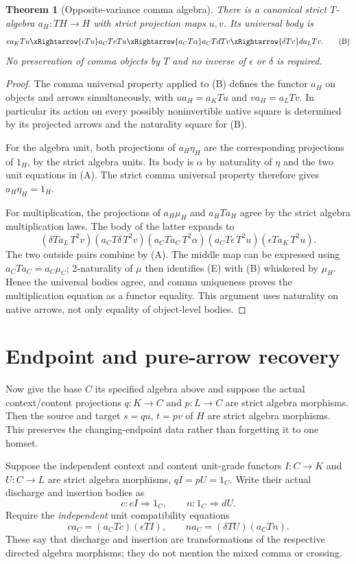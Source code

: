 \documentclass[11pt]{article}
\newtheorem{theorem}{Theorem}\newtheorem{lemma}{Lemma}
\begin{document}
\begin{theorem}[Opposite-variance comma algebra]
There is a canonical strict $T$-algebra $a_H:TH\to H$ with strict projection maps $u,v$. Its universal body is
\[
 e a_K T u\xRightarrow{\epsilon T u}
 a_C T e T u\xRightarrow{a_C T\alpha}
 a_C T d T v\xRightarrow{\delta T v}
 d a_L T v.
\tag{B}
\]
No preservation of comma objects by $T$ and no inverse of $\epsilon$ or $\delta$ is required.
\end{theorem}
\begin{proof}
The comma universal property applied to (B) defines the functor $a_H$ on objects and arrows simultaneously, with $u a_H=a_KTu$ and $v a_H=a_LTv$. In particular its action on every possibly noninvertible native square is determined by its projected arrows and the naturality square for (B).

For the algebra unit, both projections of $a_H\eta_H$ are the corresponding projections of $1_H$, by the strict algebra units. Its body is $\alpha$ by naturality of $\eta$ and the two unit equations in (A). The strict comma universal property therefore gives $a_H\eta_H=1_H$.

For multiplication, the projections of $a_H\mu_H$ and $a_HTa_H$ agree by the strict algebra multiplication laws. The body of the latter expands to
\[
 (\delta T a_L\,T^2v)
 (a_C T\delta\,T^2v)
 (a_C T a_C\,T^2\alpha)
 (a_C T\epsilon\,T^2u)
 (\epsilon T a_K\,T^2u).
\tag{E}
\]
The two outside pairs combine by (A). The middle map can be expressed using $a_CT a_C=a_C\mu_C$; 2-naturality of $\mu$ then identifies (E) with (B) whiskered by $\mu_H$. Hence the universal bodies agree, and comma uniqueness proves the multiplication equation as a functor equality. This argument uses naturality on native arrows, not only equality of object-level bodies.
\end{proof}

\section{Endpoint and pure-arrow recovery}
Now give the base $C$ its specified algebra above and suppose the actual context/content projections $q:K\to C$ and $p:L\to C$ are strict algebra morphisms. Then the source and target $s=qu$, $t=pv$ of $H$ are strict algebra morphisms. This preserves the changing-endpoint data rather than forgetting it to one homset.

Suppose the independent context and content unit-grade functors $I:C\to K$ and $U:C\to L$ are strict algebra morphisms, $qI=pU=1_C$. Write their actual discharge and insertion bodies as
\[
 c:eI\Rightarrow1_C,\qquad n:1_C\Rightarrow dU.
\]
Require the \emph{independent} unit compatibility equations
\[
 c a_C=(a_CT c)(\epsilon TI),\qquad
 n a_C=(\delta TU)(a_CT n).
\tag{U}
\]
These say that discharge and insertion are transformations of the respective directed algebra morphisms; they do not mention the mixed comma or crossing.
\end{document}
